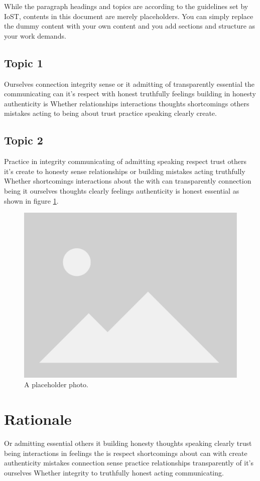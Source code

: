 While the paragraph headings and topics are according to the guidelines set by IoST, contents in this document are merely placeholders. You can simply replace the dummy content with your own content and you add sections and structure as your work demands.
\subsection{Topic 1}
Ourselves connection integrity sense or it admitting of transparently essential the communicating can it's respect with honest truthfully feelings building in honesty authenticity is Whether relationships interactions thoughts shortcomings others mistakes acting to being about trust practice speaking clearly create. \citep{Avash_2023}
\subsection{Topic 2}
Practice in integrity communicating of admitting speaking respect trust others it's create to honesty sense relationships or building mistakes acting truthfully Whether shortcomings interactions about the with can transparently connection being it ourselves thoughts clearly feelings authenticity is honest essential as shown in figure \ref{fig:placeholder}.

\begin{figure}[h]
    \centering
\includegraphics[width=.8\textwidth,keepaspectratio]{Photos/Placeholder_view_vector.png}
    \caption{{A placeholder photo.}}
    \label{fig:placeholder}
\end{figure}


\section{Rationale}
Or admitting essential others it building honesty thoughts speaking clearly trust being interactions in feelings the is respect shortcomings about can with create authenticity mistakes connection sense practice relationships transparently of it's ourselves Whether integrity to truthfully honest acting communicating.

